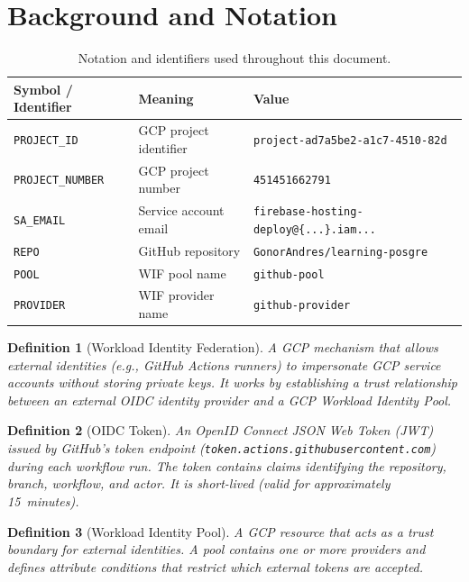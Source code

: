 \documentclass[11pt,a4paper]{article}
\theoremstyle{plainref}
\newtheorem{definition}{Definition}[section]
\begin{document}
\section{Background and Notation}

\begin{table}[h]
\centering
\caption{Notation and identifiers used throughout this document.}
\begin{tabular}{@{}lll@{}}
\toprule
\textbf{Symbol / Identifier} & \textbf{Meaning} & \textbf{Value} \\
\midrule
\texttt{PROJECT\_ID} & GCP project identifier & \texttt{project-ad7a5be2-a1c7-4510-82d} \\
\texttt{PROJECT\_NUMBER} & GCP project number & \texttt{451451662791} \\
\texttt{SA\_EMAIL} & Service account email & \texttt{firebase-hosting-deploy@\{...\}.iam...} \\
\texttt{REPO} & GitHub repository & \texttt{GonorAndres/learning-posgre} \\
\texttt{POOL} & WIF pool name & \texttt{github-pool} \\
\texttt{PROVIDER} & WIF provider name & \texttt{github-provider} \\
\bottomrule
\end{tabular}
\end{table}

\begin{definition}[Workload Identity Federation]
A GCP mechanism that allows external identities (e.g., GitHub Actions runners)
to impersonate GCP service accounts without storing private keys. It works by
establishing a trust relationship between an external OIDC identity provider
and a GCP Workload Identity Pool.
\end{definition}

\begin{definition}[OIDC Token]
An OpenID Connect JSON Web Token (JWT) issued by GitHub's token endpoint
(\texttt{token.actions.githubusercontent.com}) during each workflow run. The
token contains claims identifying the repository, branch, workflow, and actor.
It is short-lived (valid for approximately 15~minutes).
\end{definition}

\begin{definition}[Workload Identity Pool]
A GCP resource that acts as a trust boundary for external identities. A pool
contains one or more providers and defines attribute conditions that restrict
which external tokens are accepted.
\end{definition}
\end{document}
